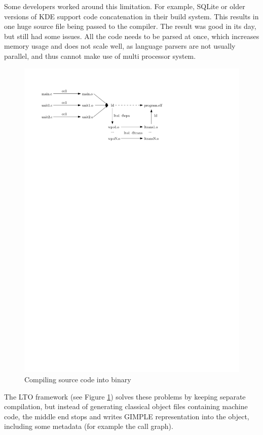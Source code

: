 Some developers worked around this limitation. For example, SQLite or older versions
of KDE support code concatenation in their build system. This results in one
huge source file being passed to the compiler. The result was good in its day,
but still had some issues. All the code needs to be parsed at once, which
increases memory usage and does not scale well, as language parsers are not
usually parallel, and thus cannot make use of multi processor system.

\begin{figure}[h!]
	\label{figure-lto-workflow}
	\centering
	\includegraphics{./img/lto-workflow.pdf}
	\caption{Compiling source code into binary}
\end{figure}

The LTO framework (see Figure \ref{figure-lto-workflow}) solves these problems by keeping separate compilation, but
instead of generating classical object files containing machine code, the
middle end stops and writes GIMPLE representation into the object, including
some metadata (for example the call graph).

